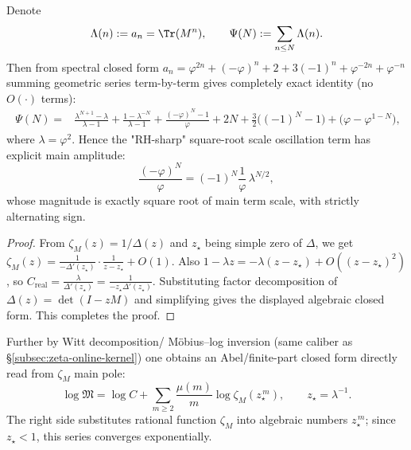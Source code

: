 \begin{corollary}\label{cor:real-input-40-chebyshev-explicit}
Denote
\[
\Lambda(n):=a_n=\Tr(M^n),
\qquad
\Psi(N):=\sum_{n\le N}\Lambda(n).
\]
Then from spectral closed form
\(
a_n=\varphi^{2n}+(-\varphi)^n+2+3(-1)^n+\varphi^{-2n}+\varphi^{-n}
\)
summing geometric series term-by-term gives completely exact identity (no \(O(\cdot)\) terms):
\[
\boxed{\;
\begin{aligned}
\Psi(N)
={}&\frac{\lambda^{N+1}-\lambda}{\lambda-1}
+\frac{1-\lambda^{-N}}{\lambda-1}
+\frac{(-\varphi)^N-1}{\varphi}
+2N+\frac{3}{2}\bigl((-1)^N-1\bigr)
+\bigl(\varphi-\varphi^{1-N}\bigr),
\end{aligned}}
\]
where \(\lambda=\varphi^2\).
Hence the "RH-sharp" square-root scale oscillation term has explicit main amplitude:
\[
\frac{(-\varphi)^N}{\varphi}=(-1)^N\frac{1}{\varphi}\,\lambda^{N/2},
\]
whose magnitude is exactly square root of main term scale, with strictly alternating sign.
\end{corollary}
\begin{proof}
From \(\zeta_M(z)=1/\Delta(z)\) and \(z_\star\) being simple zero of \(\Delta\), we get
\(
\zeta_M(z)=\frac{1}{-\Delta'(z_\star)}\cdot\frac{1}{z-z_\star}+O(1)
\).
Also \(1-\lambda z=-\lambda(z-z_\star)+O((z-z_\star)^2)\), so
\(
C_{\mathrm{real}}=\frac{\lambda}{\Delta'(z_\star)}=\frac{1}{-z_\star\Delta'(z_\star)}
\).
Substituting factor decomposition of \(\Delta(z)=\det(I-zM)\) and simplifying gives the displayed algebraic closed form. This completes the proof.
\end{proof}
Further by Witt decomposition/ Möbius--log inversion (same caliber as \S\ref{subsec:zeta-online-kernel}) one obtains an Abel/finite-part closed form directly read from $\zeta_M$ main pole:
\[
\log\mathfrak{M}
=\log C+\sum_{m\ge 2}\frac{\mu(m)}{m}\log\zeta_M(z_\star^{\,m}),
\qquad z_\star=\lambda^{-1}.
\]
The right side substitutes rational function $\zeta_M$ into algebraic numbers $z_\star^{\,m}$; since $z_\star<1$, this series converges exponentially.

